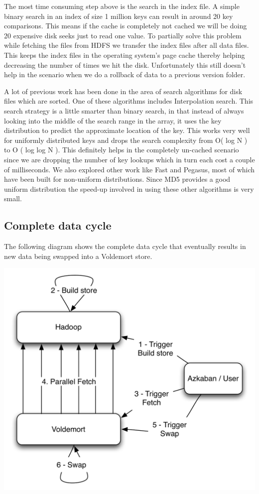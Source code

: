 \documentclass[10pt,twocolumn,preprint,natbib,authoryear]{sigplanconf}
\begin{document}
The most time consuming step above is the search in the index file. A simple binary search in an index of size 1 million keys can result in around 20 key comparisons. This means if the cache is completely not cached we will be doing 20 expensive disk seeks just to read one value. To partially solve this problem while fetching the files from HDFS we transfer the index files after all data files. This keeps the index files in the operating system's page cache thereby helping decreasing the number of times we hit the disk. Unfortunately this still doesn't help in the scenario when we do a rollback of data to a previous version folder. 

A lot of previous work has been done in the area of search algorithms for disk files which are sorted. One of these algorithms includes Interpolation search\cite{An adaptation of a root finding method to searching ordered disk files}. This search strategy is a little smarter than binary search, in that instead of always looking into the middle of the search range in the array, it uses the key distribution to predict the approximate location of the key. This works very well for uniformly distributed keys and drops the search complexity from O( log N ) to O ( log log N ). This definitely helps in the completely un-cached scenario since we are dropping the number of key lookups which in turn each cost a couple of milliseconds. We also explored other work like Fast and Pegasus, most of which have been built for non-uniform distributions. Since MD5 provides a good uniform distribution the speed-up involved in using these other algorithms is very small. 

\subsection{Complete data cycle}

The following diagram shows the complete data cycle that eventually results in new data being swapped into a Voldemort store. 

\begin{center}
\includegraphics[scale=0.60]{cycle.png}
\end{center}
\end{document}

